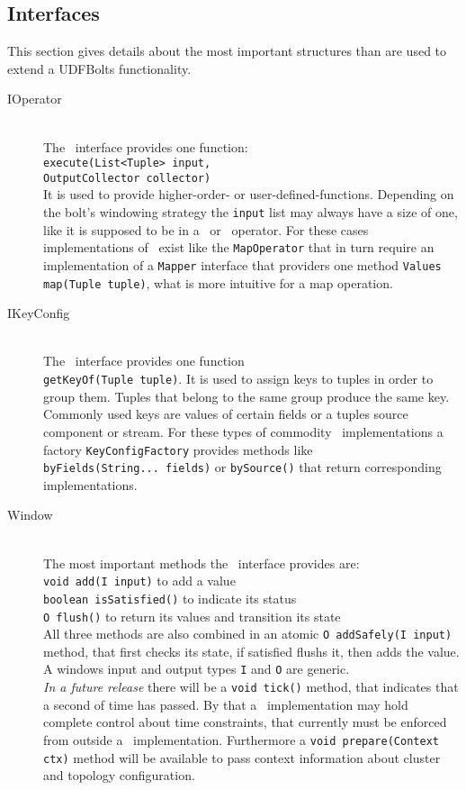 \subsection{Interfaces}
\label{sect:interfaces}
This section gives details about the most important structures than are used to extend a UDFBolts functionality.
\begin{description}
	\item[IOperator] \hfill \\
	The \ioperator\ interface provides one function: \\
	\texttt{execute(List<Tuple> input, \\ OutputCollector collector)} \\
	It is used to provide higher-order- or user-defined-functions. Depending on the bolt's windowing strategy the \texttt{input} list may always have a size of one, like it is supposed to be in a \map\ or \filter\ operator. For these cases implementations of \ioperator\ exist like the \texttt{MapOperator} that in turn require an implementation of a \texttt{Mapper} interface that providers one method \texttt{Values map(Tuple tuple)}, what is more intuitive for a map operation.
	\item[IKeyConfig] \hfill \\
	\label{item:ikeyconfig}
	The \ikeyconfig\ interface provides one function \\ \texttt{getKeyOf(Tuple tuple)}. It is used to assign keys to tuples in order to group them. Tuples that belong to the same group produce the same key. Commonly used keys are values of certain fields or a tuples source component or stream. For these types of commodity  \ikeyconfig\ implementations a factory \texttt{KeyConfigFactory} provides methods like \\
	 \texttt{byFields(String... fields)} or \texttt{bySource()} that return corresponding implementations.
	\item[Window] \hfill \\
	The most important methods the \iwindow\ interface provides are:\\
	\texttt{void add(I input)} to add a value \\
	\texttt{boolean isSatisfied()} to indicate its status \\
	\texttt{O flush()} to return its values and transition its state  \\
	All three methods are also combined in an atomic 
	\texttt{O addSafely(I input)}
	method, that first checks its state, if satisfied flushs it, then adds the value.
	A windows input and output types \texttt{I} and \texttt{O} are generic. \\
	\textsl{In a future release} there will be a \texttt{void tick()} method, that indicates that a second of time has passed. By that a \iwindow\ implementation may hold complete control about time constraints, that currently must be enforced from outside a \iwindow\ implementation. Furthermore a \texttt{void prepare(Context ctx)} method will be available to pass context information about cluster and topology configuration. 
\end{description}

